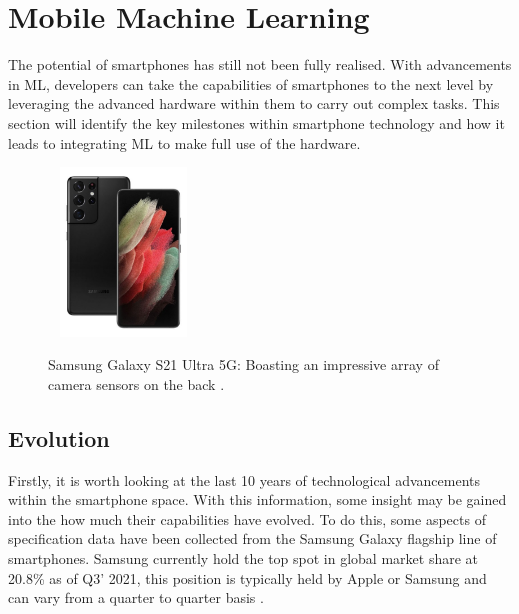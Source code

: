 \documentclass[12pt,a4paper]{report}
\begin{document}
\section{Mobile Machine Learning}

The potential of smartphones has still not been fully realised. With advancements in ML, developers can take the 
capabilities of smartphones to the next level by leveraging the advanced hardware within them to carry out complex 
tasks. This section will identify the key milestones within smartphone technology and how it leads to integrating 
ML to make full use of the hardware.

\begin{figure}[h]\
    \centering
    \includegraphics[width=0.3\textwidth]{s21ultra.jpg}
    \caption{Samsung Galaxy S21 Ultra 5G: Boasting an impressive array of camera sensors on the back \citep{three2021}.}
\end{figure}

\break

\subsection{Evolution}

Firstly, it is worth looking at the last 10 years of technological advancements within the smartphone space. 
With this information, some insight may be gained into the how much their capabilities have evolved. To do this, some
aspects of specification data have been collected from the Samsung Galaxy flagship line of smartphones. Samsung 
currently hold the top spot in global market share at 20.8\% as of Q3' 2021, this position is typically held by Apple or
Samsung and can vary from a quarter to quarter basis \citep{odea2021}.

\par
\end{document}
